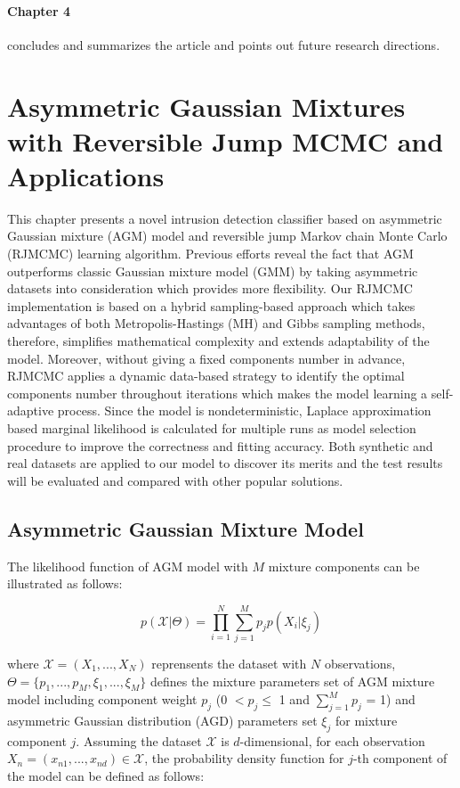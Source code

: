 \paragraph{Chapter 4} concludes and summarizes the article and points out future research directions.

\section{Asymmetric Gaussian Mixtures with Reversible Jump MCMC and Applications}
\label{sec:2}
This chapter presents a novel intrusion detection classifier based on asymmetric Gaussian mixture (AGM) model and reversible jump Markov chain Monte Carlo (RJMCMC) learning algorithm. Previous efforts reveal the fact that AGM outperforms classic Gaussian mixture model (GMM) by taking asymmetric datasets into consideration which provides more flexibility. Our RJMCMC implementation is based on a hybrid sampling-based approach which takes advantages of both Metropolis-Hastings (MH) and Gibbs sampling methods, therefore, simplifies mathematical complexity and extends adaptability of the model. Moreover, without giving a fixed components number in advance, RJMCMC applies a dynamic data-based strategy to identify the optimal components number throughout iterations which makes the model learning a self-adaptive process. Since the model is nondeterministic, Laplace approximation based marginal likelihood is calculated for multiple runs as model selection procedure to improve the correctness and fitting accuracy. Both synthetic and real datasets are applied to our model to discover its merits and the test results will be evaluated and compared with other popular solutions.

\subsection{Asymmetric Gaussian Mixture Model}
\label{sec:2.1}
The likelihood function of AGM model \cite{Elguebaly2014} with $M$ mixture components can be illustrated as follows:

\begin{equation}
p(\mathcal{X}|\Theta) = \prod_{i=1}^N \sum_{j=1}^Mp_jp(X_i|\xi_j)
\label{eq:likelihood}
\end{equation}

where $\mathcal{X} = (X_1,...,X_N)$ reprensents the dataset with $N$ observations, $\Theta = \{p_1,...,p_M, \xi_1,...,\xi_M\}$ defines the mixture parameters set of AGM mixture model including component weight $p_j$ (0 $< p_j \leq$ 1 and $\sum_{j=1}^Mp_j$ = 1) and asymmetric Gaussian distribution (AGD) parameters set $\xi_j$ for mixture component $j$. Assuming the dataset $\mathcal{X}$ is $d$-dimensional, for each observation $X_n = (x_{n1},...,x_{nd})\in\mathcal{X}$, the probability density function \cite{Elguebaly2014} for $j$-th component of the model can be defined as follows:

